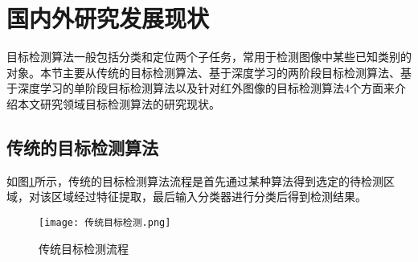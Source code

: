 \section{国内外研究发展现状}
目标检测算法一般包括分类和定位两个子任务，常用于检测图像中某些已知类别的对象。本节主要从传统的目标检测算法、基于深度学习的两阶段目标检测算法、基于深度学习的单阶段目标检测算法以及针对红外图像的目标检测算法4个方面来介绍本文研究领域目标检测算法的研究现状\cite{尹宏鹏2016基于视觉的目标检测与跟踪综述}。

\subsection{传统的目标检测算法}
如图\ref{ct}所示，传统的目标检测算法流程是首先通过某种算法得到选定的待检测区域，对该区域经过特征提取，最后输入分类器进行分类后得到检测结果。

\begin{figure}[htbp]
    \centering
    \texttt{[image: 传统目标检测.png]}
    \caption{传统目标检测流程}
    \label{ct}
\end{figure}

